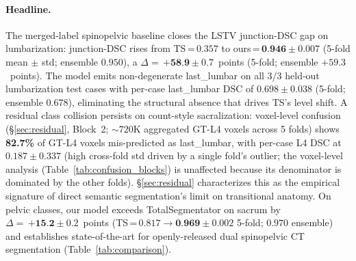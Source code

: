\documentclass{article}
\newcommand{\TS}{TotalSegmentator}
\newcommand{\sota}{TS}
\begin{document}
\paragraph{Headline.}
The merged-label spinopelvic baseline closes the LSTV
junction-DSC gap on lumbarization: junction-DSC rises
from \sota{}\,=\,$0.357$ to ours\,=\,$\textbf{0.946} \pm
0.007$ (5-fold mean $\pm$ std; ensemble $0.950$), a
$\Delta{=}\,\textbf{+58.9} \pm 0.7$~points (5-fold;
ensemble $+59.3$~points). The model emits non-degenerate
last\_lumbar on all 3/3 held-out lumbarization test
cases with per-case last\_lumbar DSC of
$0.698 \pm 0.038$ (5-fold; ensemble $0.678$),
eliminating the structural absence that drives \sota{}'s
level shift. A residual class collision persists on
count-style sacralization: voxel-level confusion
(\S\ref{sec:residual}, Block~2; ${\sim}720$K aggregated
GT-L4 voxels across 5 folds) shows
\textbf{82.7\%} of GT-L4 voxels mis-predicted as
last\_lumbar, with per-case L4 DSC at
$0.187 \pm 0.337$ (high cross-fold std driven by a
single fold's outlier; the voxel-level analysis
(Table~\ref{tab:confusion_blocks}) is unaffected because
its denominator is dominated by the other folds). \S\ref{sec:residual} characterizes this as the
empirical signature of direct semantic segmentation's
limit on transitional anatomy. On pelvic classes, our
model exceeds \TS{} on sacrum by
$\Delta{=}\,\textbf{+15.2} \pm 0.2$~points
(\sota{}\,=\,$0.817 \to \textbf{0.969} \pm 0.002$
5-fold; $0.970$ ensemble) and establishes
state-of-the-art for openly-released dual spinopelvic CT
segmentation (Table~\ref{tab:comparison}).
\end{document}
